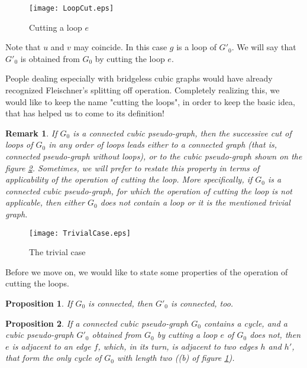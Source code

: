 \documentclass[fleqn,12pt,twoside]{article}
\newtheorem{proposition}{Proposition}
\newtheorem{remark}{Remark}
\begin{document}
\begin{figure}[h]
\begin{center}
\texttt{[image: LoopCut.eps]}\\
\caption{Cutting a loop $e$}\label{loopcut}
\end{center}
\end{figure}


Note that $u$ and $v$ may coincide. In this case $g$ is a loop of $G'_{0}$. We will say that $G'_{0}$ is obtained from $G_{0}$ by
cutting the loop $e$.

People dealing especially with bridgeless cubic graphs would have
already recognized Fleischner's splitting off operation. Completely
realizing this, we would like to keep the name "cutting the loops",
in order to keep the basic idea, that has helped us to come to its
definition!

\begin{remark}
\label{SuccessiveCut}If $G_{0}$ is a connected cubic pseudo-graph,
then the successive cut of loops of $G_{0}$ in any order of loops
leads either to a connected graph (that is, connected pseudo-graph
without loops), or to the cubic pseudo-graph shown on the figure
\ref{TrivialCase}. Sometimes, we will prefer to restate this
property in terms of applicability of the operation of cutting the
loop. More specifically, if $G_{0}$ is a connected cubic
pseudo-graph, for which the operation of cutting the loop is not
applicable, then either $G_{0}$ does not contain a loop or it is the
mentioned trivial graph.
\end{remark}

\begin{figure}[h]
\begin{center}
\texttt{[image: TrivialCase.eps]}\\
\caption{The trivial case}\label{TrivialCase}
\end{center}
\end{figure}

Before we move on, we would like to state some properties of the
operation of cutting the loops.

\begin{proposition}
\label{ConnectedInvariance}If $G_{0}$ is connected, then $G'_{0}$ is
connected, too.
\end{proposition}

\begin{proposition}
\label{CycleInvariance}If a connected cubic pseudo-graph $G_{0}$
contains a cycle, and a cubic pseudo-graph $G'_{0}$ obtained from
$G_{0}$ by cutting a loop $e$ of $G_{0}$ does not, then $e$ is
adjacent to an edge $f$, which, in its turn, is adjacent to two
edges $h$ and $h'$, that form the only cycle of $G_{0}$ with length
two ((b) of figure \ref{loopcut}).
\end{proposition}
\end{document}
